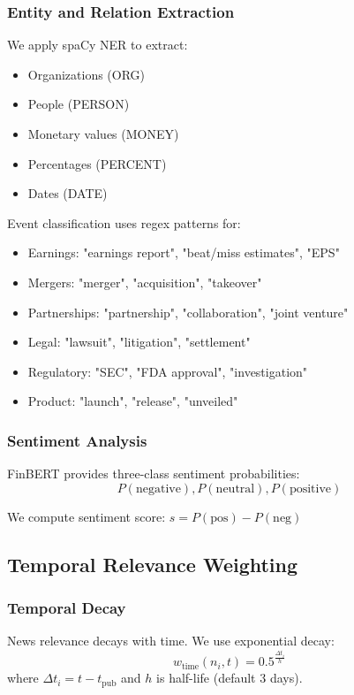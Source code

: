 \documentclass[conference]{IEEEtran}
\begin{document}
\subsubsection{Entity and Relation Extraction}
We apply spaCy NER to extract:
\begin{itemize}
    \item Organizations (ORG)
    \item People (PERSON)
    \item Monetary values (MONEY)
    \item Percentages (PERCENT)
    \item Dates (DATE)
\end{itemize}

Event classification uses regex patterns for:
\begin{itemize}
    \item Earnings: "earnings report", "beat/miss estimates", "EPS"
    \item Mergers: "merger", "acquisition", "takeover"
    \item Partnerships: "partnership", "collaboration", "joint venture"
    \item Legal: "lawsuit", "litigation", "settlement"
    \item Regulatory: "SEC", "FDA approval", "investigation"
    \item Product: "launch", "release", "unveiled"
\end{itemize}

\subsubsection{Sentiment Analysis}
FinBERT provides three-class sentiment probabilities:
$$P(\text{negative}), P(\text{neutral}), P(\text{positive})$$

We compute sentiment score: $s = P(\text{pos}) - P(\text{neg})$

\subsection{Temporal Relevance Weighting}

\subsubsection{Temporal Decay}
News relevance decays with time. We use exponential decay:
$$w_{\text{time}}(n_i, t) = 0.5^{\frac{\Delta t_i}{h}}$$
where $\Delta t_i = t - t_{\text{pub}}$ and $h$ is half-life (default 3 days).
\end{document}
